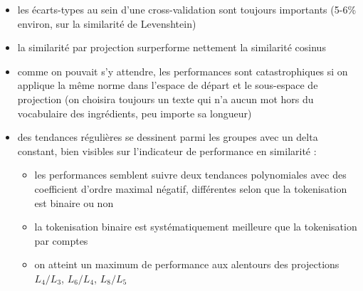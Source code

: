            \begin{itemize}
                \item les écarts-types au sein d'une cross-validation sont toujours importants (5-6\% environ, sur la similarité de Levenshtein)
                \item la similarité par projection surperforme nettement la similarité cosinus
                \item comme on pouvait s'y attendre, les performances sont catastrophiques si on applique la même norme dans l'espace de départ et le sous-espace de projection (on choisira toujours un texte qui n'a aucun mot hors du vocabulaire des ingrédients, peu importe sa longueur)
                \item des tendances régulières se dessinent parmi les groupes avec un delta constant, bien visibles sur l'indicateur de performance en similarité : 
                \begin{itemize}
                    \item les performances semblent suivre deux tendances polynomiales avec des coefficient d'ordre maximal négatif, différentes selon que la tokenisation est binaire ou non
                    \item la tokenisation binaire est systématiquement meilleure que la tokenisation par comptes
                    \item on atteint un maximum de performance aux alentours des projections $L_{4}/L_{3}$, $L_{6}/L_{4}$, $L_{8}/L_{5}$
                \end{itemize}
            \end{itemize}

